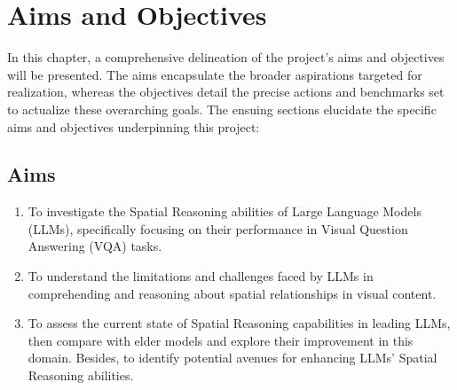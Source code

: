 \documentclass[twocolumn,11pt]{report}
\begin{document}

\chapter{Aims and Objectives}\label{chap:Aims and Objectives}

In this chapter, a comprehensive delineation of the project's aims and objectives will be presented. The aims encapsulate the broader aspirations targeted for realization, whereas the objectives detail the precise actions and benchmarks set to actualize these overarching goals. The ensuing sections elucidate the specific aims and objectives underpinning this project:
\section{Aims}
\begin{enumerate}
    \item To investigate the Spatial Reasoning abilities of Large Language Models (LLMs), specifically focusing on their performance in Visual Question Answering (VQA) tasks.
    \item To understand the limitations and challenges faced by LLMs in comprehending and reasoning about spatial relationships in visual content.
    \item To assess the current state of Spatial Reasoning capabilities in leading LLMs, then compare with elder models and explore their improvement in this domain. Besides, to identify potential avenues for enhancing LLMs' Spatial Reasoning abilities.
\end{enumerate}
\end{document}
